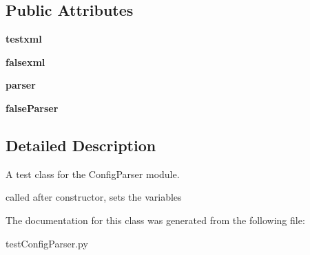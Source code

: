 \subsection*{Public Attributes}
\begin{CompactItemize}
\item 
\hypertarget{classtools_1_1testConfigParser_1_1testConfigParser_2c801c8beb4faf426081fc54a31a1c20}{
\textbf{testxml}}
\label{classtools_1_1testConfigParser_1_1testConfigParser_2c801c8beb4faf426081fc54a31a1c20}

\item 
\hypertarget{classtools_1_1testConfigParser_1_1testConfigParser_568a2ad22e901ef1a5cfd6d7df642df2}{
\textbf{falsexml}}
\label{classtools_1_1testConfigParser_1_1testConfigParser_568a2ad22e901ef1a5cfd6d7df642df2}

\item 
\hypertarget{classtools_1_1testConfigParser_1_1testConfigParser_ceed80dc45bd57e8304c9c20716c8fa3}{
\textbf{parser}}
\label{classtools_1_1testConfigParser_1_1testConfigParser_ceed80dc45bd57e8304c9c20716c8fa3}

\item 
\hypertarget{classtools_1_1testConfigParser_1_1testConfigParser_ee33eeddbb65528094b4328b3298e963}{
\textbf{falseParser}}
\label{classtools_1_1testConfigParser_1_1testConfigParser_ee33eeddbb65528094b4328b3298e963}

\end{CompactItemize}


\subsection{Detailed Description}
A test class for the ConfigParser module. 

called after constructor, sets the variables 

The documentation for this class was generated from the following file:\begin{CompactItemize}
\item 
testConfigParser.py\end{CompactItemize}
